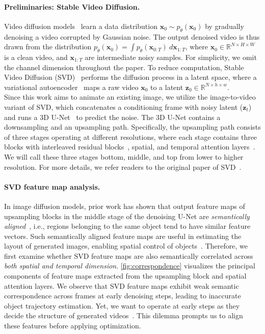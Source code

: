 \paragraph{Preliminaries: Stable Video Diffusion.}
Video diffusion models~\citep{VideoDiffusionModels} learn a data distribution $\bm{x}_0 \sim p_\theta(\bm{x}_0)$ by gradually denoising a video corrupted by Gaussian noise. 
The output denoised video is thus drawn from the distribution $p_\theta(\bm{x}_0) = \int p_\theta(\bm{x}_{0:T}) \ d\bm{x}_{1:T}$, where $\bm{x}_0 \in \mathbb{R}^{N \times H \times W}$ is a clean video, and $\bm{x}_{1:T}$ are intermediate noisy samples.
For simplicity, we omit the channel dimension throughout the paper.
To reduce computation, Stable Video Diffusion (SVD)~\citep{blattmann2023stable} performs the diffusion process in a latent space, where a variational autoencoder~\citep{VAE} maps a raw video $\bm{x}_0$ to a latent $\bm{z}_0 \in \mathbb{R}^{N \times h \times w}$. \\
Since this work aims to animate an existing image, we utilize the image-to-video variant of SVD, which concatenates a conditioning frame with noisy latent ($\bm{z}_t$) and runs a 3D U-Net~\citep{U-net} to predict the noise.
The 3D U-Net contains a downsampling and an upsampling path.
Specifically, the upsampling path consists of three stages operating at different resolutions, where each stage contains three blocks with interleaved residual blocks~\citep{ResNet}, spatial, and temporal attention layers~\citep{Transformer}.
We will call these three stages bottom, middle, and top from lower to higher resolution.
For more details, we refer readers to the original paper of SVD~\citep{blattmann2023stable}.


\vspace{-2.0mm}
\paragraph{SVD feature map analysis.} 
In image diffusion models, prior work has shown that output feature maps of upsampling blocks in the middle stage of the denoising U-Net are \textit{semantically aligned}~\citep{tang2023emergent, namekata2024emerdiff, hedlin2024unsupervised, zhang2023tale, luo2023dhf}, i.e., regions belonging to the same object tend to have similar feature vectors. %
Such semantically aligned feature maps are useful in estimating the layout of generated images, enabling spatial control of objects~\citep{shi2024dragdiffusion, mou2023dragondiffusion}.
Therefore, we first examine whether SVD feature maps are also semantically correlated across \textit{both spatial and temporal dimension}. %
\cref{fig:correspondence} visualizes the principal components of feature maps extracted from the upsampling block and spatial attention layers.
We observe that SVD feature maps exhibit weak semantic correspondence across frames at early denoising steps, leading to inaccurate object trajectory estimation.
Yet, we want to operate at early steps as they decide the structure of generated videos~\citep{materzynska2023customizing}.
This dilemma prompts us to align these features before applying optimization.

